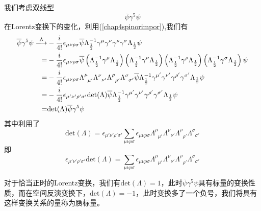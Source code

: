 我们考虑双线型
\begin{equation}
    \overline{\psi}\gamma^{5}\psi
\end{equation}
在Lorentz变换下的变化，利用(\ref{chap4spinorimpor}),我们有
\begin{equation}
\begin{aligned}
    \overline{\psi}\gamma^{5}\psi\xlongrightarrow{\Lambda}&-\frac{i}{4!}\epsilon_{\mu\nu\rho\sigma}\overline{\psi}\Lambda^{-1}_{\frac{1}{2}}\gamma^{\mu}\gamma^{\nu}\gamma^{\rho}\gamma^{\sigma}\Lambda_{\frac{1}{2}}\psi\\
    =&-\frac{i}{4!}\epsilon_{\mu\nu\rho\sigma}\overline{\psi}\left(\Lambda^{-1}_{\frac{1}{2}}\gamma^{\mu}\Lambda_{\frac{1}{2}}\right)\left(\Lambda^{-1}_{\frac{1}{2}}\gamma^{\nu}\Lambda_{\frac{1}{2}}\right)\left(\Lambda^{-1}_{\frac{1}{2}}\gamma^{\rho}\Lambda_{\frac{1}{2}}\right)\left(\Lambda^{-1}_{\frac{1}{2}}\gamma^{\sigma}\Lambda_{\frac{1}{2}}\right)\psi\\
    =&-\frac{i}{4!}\epsilon_{\mu\nu\rho\sigma}\Lambda^{\mu}_{\;\;\mu'}\Lambda^{\nu}_{\;\;\nu'}\Lambda^{\rho}_{\;\;\rho'}\Lambda^{\sigma}_{\;\;\sigma'}\overline{\psi}\Lambda^{-1}_{\frac{1}{2}}\gamma^{\mu'}\gamma^{\nu'}\gamma^{\rho'}\gamma^{\sigma'}\Lambda_{\frac{1}{2}}\psi\\
    =&-\frac{i}{4!}\epsilon_{\mu'\nu'\rho'\sigma'}\text{det}(\Lambda)\overline{\psi}\Lambda^{-1}_{\frac{1}{2}}\gamma^{\mu'}\gamma^{\nu'}\gamma^{\rho'}\gamma^{\sigma'}\Lambda_{\frac{1}{2}}\psi\\
    =&\text{det}(\Lambda)\overline{\psi}\gamma^{5}\psi
    \end{aligned}
\end{equation}
其中利用了
\begin{equation}
\text{det}(\Lambda)=\epsilon_{\mu'\nu'\rho'\sigma'}\sum\limits_{\mu\nu\rho\sigma}\epsilon_{\mu\nu\rho\sigma}\Lambda^{\mu}_{\;\;\mu'}\Lambda^{\nu}_{\;\;\nu'}\Lambda^{\rho}_{\;\;\rho'}\Lambda^{\sigma}_{\;\;\sigma'}
\end{equation}
即
\begin{equation}
\epsilon_{\mu'\nu'\rho'\sigma'}\text{det}(\Lambda)=\sum\limits_{\mu\nu\rho\sigma}\epsilon_{\mu\nu\rho\sigma}\Lambda^{\mu}_{\;\;\mu'}\Lambda^{\nu}_{\;\;\nu'}\Lambda^{\rho}_{\;\;\rho'}\Lambda^{\sigma}_{\;\;\sigma'}
\end{equation}

对于恰当正时的Lorentz变换，我们有$\text{det}(\Lambda)=1$，此时$\overline{\psi}\gamma^{5}\psi$具有标量的变换性质，而在空间反演变换下，$\text{det}(\Lambda)=-1$，此时变换多了一个负号，我们将具有这样变换关系的量称为赝标量。

